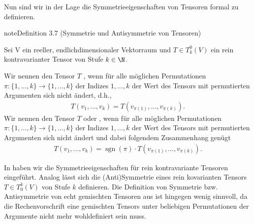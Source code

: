 \documentclass[letterpaper,10pt,english]{jupyterBook}
\begin{document}
\sphinxAtStartPar
Nun sind wir in der Lage die Symmetrieeigenschaften von Tensoren formal zu definieren.
\label{vektoranalysis/tensor:def:symmetrieTensor}
\begin{sphinxadmonition}{note}{Definition 3.7 (Symmetrie und Antisymmetrie von Tensoren)}



\sphinxAtStartPar
Sei V ein reeller, endlich\sphinxhyphen{}dimensionaler Vektorraum und \(T \in T_k^0(V)\) ein rein kontravarianter Tensor von Stufe \(k \in \N\).

\sphinxAtStartPar
Wir nennen den Tensor \(T\) , wenn für alle möglichen Permutationen \(\pi \colon \lbrace 1,\ldots, k\rbrace \rightarrow \lbrace 1,\ldots, k\rbrace\) der Indizes \(1,\ldots,k\) der Wert des Tensors mit permutierten Argumenten sich nicht ändert, d.h.,
\begin{equation*}
\begin{split}T(v_1, \ldots, v_k) = T(v_{\pi(1)}, \ldots, v_{\pi(k)}).\end{split}
\end{equation*}
\sphinxAtStartPar
Wir nennen den Tensor \(T\)  oder , wenn für alle möglichen Permutationen \(\pi \colon \lbrace 1,\ldots, k\rbrace \rightarrow \lbrace 1,\ldots, k\rbrace\) der Indizes \(1,\ldots,k\) der Wert des Tensors mit permutierten Argumenten sich  nicht ändert und dabei folgendem Zusammenhang genügt
\begin{equation*}
\begin{split}T(v_1, \ldots, v_k) = \operatorname{sgn}(\pi) \cdot T(v_{\pi(1)}, \ldots, v_{\pi(k)}).\end{split}
\end{equation*}\end{sphinxadmonition}

\sphinxAtStartPar
In {\hyperref[\detokenize{vektoranalysis/tensor:def:symmetrieTensor}]{}} haben wir die Symmetrieeigenschaften für rein kontravariante Tensoren eingeführt.
Analog lässt sich die (Anti\sphinxhyphen{})Symmetrie eines rein kovarianten Tensors \(T \in T^k_0(V)\) von Stufe \(k\) definieren.
Die Definition von Symmetrie bzw. Antisymmetrie von echt gemischten Tensoren aus {\hyperref[\detokenize{vektoranalysis/tensor:def:gemischteTensoren}]{}} ist hingegen wenig sinnvoll, da die Rechenvorschrift eine gemischten Tensors unter beliebigen Permutationen der Argumente nicht mehr wohldefiniert sein muss.
\end{document}
